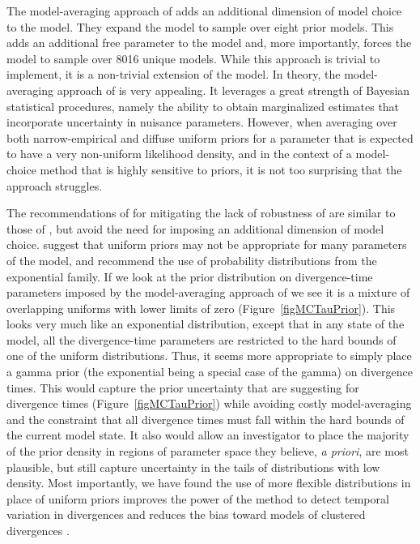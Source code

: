 The model-averaging approach of \citet{Hickerson2013} adds an additional
dimension of model choice to the model.
They expand the model to sample over eight prior models.
This adds an additional free parameter to the model and, more importantly,
forces the model to sample over 8016 unique models.
While this approach is trivial to implement, it is a non-trivial extension of
the model.
In theory, the model-averaging approach of \citet{Hickerson2013} is very
appealing.
It leverages a great strength of Bayesian statistical procedures, namely the
ability to obtain marginalized estimates that incorporate uncertainty in
nuisance parameters.
However, when averaging over both narrow-empirical and diffuse uniform priors
for a parameter that is expected to have a very non-uniform likelihood density,
and in the context of a model-choice method that is highly sensitive to priors,
it is not too surprising that the approach struggles.

The recommendations of \citet{Oaks2012} for mitigating the lack of robustness
of \msb are similar to those of \citet{Hickerson2013}, but avoid the
need for imposing an additional dimension of model choice.
\citet{Oaks2012} suggest that uniform priors may not be appropriate for many
parameters of the \msb model, and recommend the use of probability
distributions from the exponential family.
If we look at the prior distribution on divergence-time parameters imposed by
the model-averaging approach of \citet{Hickerson2013} we see it is a mixture of
overlapping uniforms with lower limits of zero (Figure~\ref{figMCTauPrior}).
This looks very much like an exponential distribution, except that in any state
of the model, all the divergence-time parameters are restricted to the hard
bounds of one of the uniform distributions.
Thus, it seems more appropriate to simply place a gamma prior (the exponential
being a special case of the gamma) on divergence times.
This would capture the prior uncertainty that \citet{Hickerson2013} are
suggesting for divergence times (Figure~\ref{figMCTauPrior}) while avoiding
costly model-averaging and the constraint that all divergence times must fall
within the hard bounds of the current model state.
It also would allow an investigator to place the majority of the prior density
in regions of parameter space they believe, \emph{a priori}, are most
plausible, but still capture uncertainty in the tails of distributions with low
density.
Most importantly, we have found the use of more flexible distributions in place
of uniform priors improves the power of the method to detect temporal variation
in divergences and reduces the bias toward models of clustered divergences
\citep{Oaks2014dpp}.



